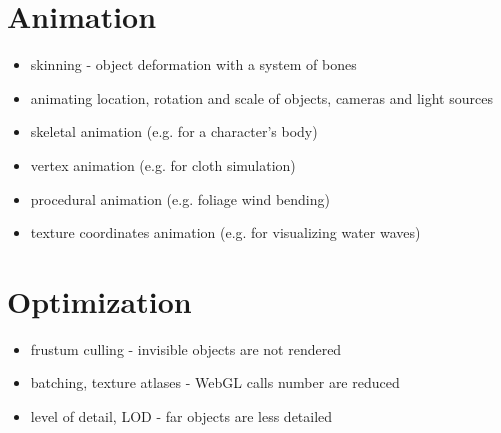 \documentclass[a4paper,12pt,oneside]{sphinxmanual}
\begin{document}
\section{Animation}
\label{features:id9}\begin{itemize}
\item {} 
skinning - object deformation with a system of bones

\item {} 
animating location, rotation and scale of objects, cameras and light sources

\item {} 
skeletal animation (e.g. for a character's body)

\item {} 
vertex animation (e.g. for cloth simulation)

\item {} 
procedural animation (e.g. foliage wind bending)

\item {} 
texture coordinates animation (e.g. for visualizing water waves)

\end{itemize}


\section{Optimization}
\label{features:id10}\begin{itemize}
\item {} 
frustum culling - invisible objects are not rendered

\item {} 
batching, texture atlases - WebGL calls number are reduced

\item {} 
level of detail, LOD - far objects are less detailed

\end{itemize}
\end{document}
